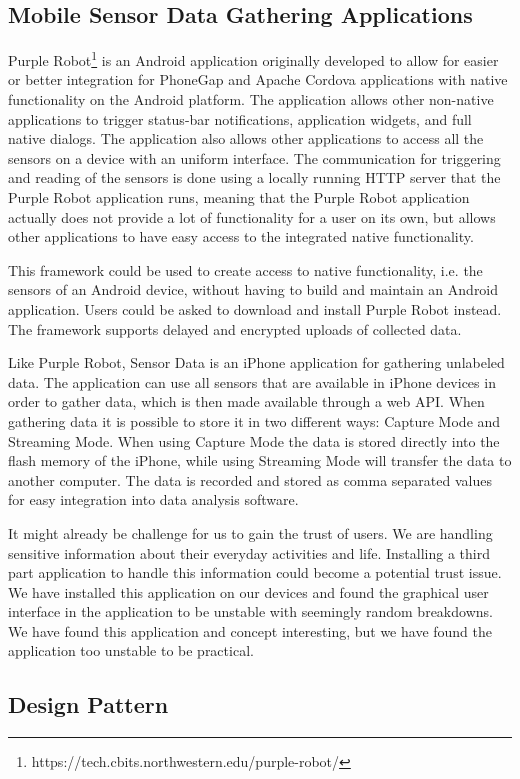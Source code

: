 \subsection{Mobile Sensor Data Gathering Applications}
\label{sub:purple_robot}

Purple Robot\footnote{https://tech.cbits.northwestern.edu/purple-robot/} is an Android application originally developed to allow for easier or better integration for PhoneGap and Apache Cordova applications with native functionality on the Android platform. The application allows other non-native applications to trigger status-bar notifications, application widgets, and full native dialogs. 
The application also allows other applications to access all the sensors on a device with an uniform interface. 
The communication for triggering and reading of the sensors is done using a locally running HTTP server that the Purple Robot application runs, meaning that the Purple Robot application actually does not provide a lot of functionality for a user on its own, but allows other applications to have easy access to the integrated native functionality.

This framework could be used to create access to native functionality, i.e. the sensors of an Android device, without having to build and maintain an Android application. Users could be asked to download and install Purple Robot instead. The framework supports delayed and encrypted uploads of collected data. 

Like Purple Robot, Sensor Data is an iPhone application for gathering unlabeled data. The application can use all sensors that are available in iPhone devices in order to gather data, which is then made available through a web API. When gathering data it is possible to store it in two different ways: Capture Mode and Streaming Mode. When using Capture Mode the data is stored directly into the flash memory of the iPhone, while using Streaming Mode will transfer the data to another computer. The data is recorded and stored as comma separated values for easy integration into data analysis software.

It might already be challenge for us to gain the trust of users. We are handling sensitive information about their everyday activities and life. 
Installing a third part application to handle this information could become a potential trust issue. We have installed this application on our devices and found the graphical user interface in the application to be unstable with seemingly random breakdowns. We have found this application and concept interesting, but we have found the application too unstable to be practical.   



\subsection{Design Pattern}


